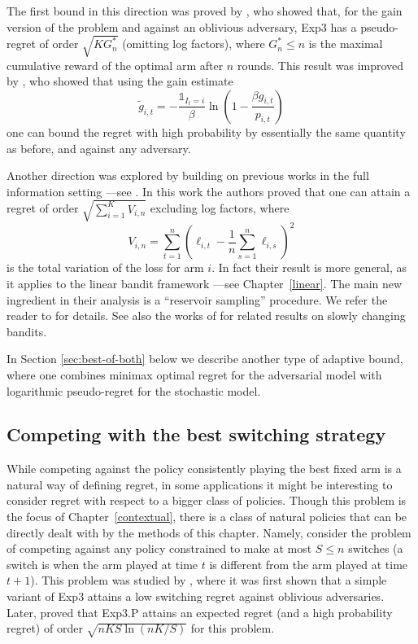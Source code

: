 \documentclass[11pt]{hackednow}
\def\ds1{\mathds{1}}
\renewcommand{\tilde}{\widetilde}
\begin{document}
The first bound in this direction was proved by \cite{ACFS03}, who showed that, for the gain version of the problem and against an oblivious adversary, Exp3 has a pseudo-regret of order $\sqrt{K G_n^*}$ (omitting log factors), where $G_n^* \leq n$ is the maximal cumulative reward of the optimal arm after $n$ rounds. This result was improved by \cite{AB10}, who showed that using the gain estimate
\[
    \tilde{g}_{i,t} = - \frac{\ds1_{I_t = i}}{\beta} \ln \left(1 - \frac{\beta g_{i,t}}{p_{i,t}} \right)
\]
one can bound the regret with high probability by essentially the same quantity as before, and against any adversary.

Another direction was explored by \cite{HK09} building on previous works in the full information setting ---see \cite{CMS07}. In this work the authors proved that one can attain a regret of order $\sqrt{\sum_{i=1}^K V_{i,n}}$ excluding log factors, where
\[
    V_{i,n} = \sum_{t=1}^n \left(\ell_{i,t} - \frac{1}{n} \sum_{s=1}^n \ell_{i,s} \right)^2
\]
is the total variation of the loss for arm $i$. In fact their result is more general, as it applies to the linear bandit framework ---see Chapter~\ref{linear}. The main new ingredient in their analysis is a ``reservoir sampling'' procedure. We refer the reader to \cite{HK09} for details. See also the works of \cite{slivkins2008adapting,slivkins2009contextual} for related results on slowly changing bandits.

In Section \ref{sec:best-of-both} below we describe another type of adaptive bound, where one combines minimax optimal regret for the adversarial model with logarithmic pseudo-regret for the stochastic model.


\subsection{Competing with the best switching strategy} \label{sec:exp3S}
While competing against the policy consistently playing the best fixed arm is a natural way of defining regret, in some applications it might be interesting to consider regret with respect to a bigger class of policies. Though this problem is the focus of Chapter~\ref{contextual}, there is a class of natural policies that can be directly dealt with by the methods of this chapter. Namely, consider the problem of competing against any policy constrained to make at most $S \leq n$ switches (a switch is when the arm played at time $t$ is different from the arm played at time $t+1$). This problem was studied by \cite{Aue02}, where it was first shown that a simple variant of Exp3 attains a low switching regret against oblivious adversaries. Later, \cite{AB10} proved that Exp3.P attains an expected regret (and a high probability regret) of order $\sqrt{n K S \ln (n K /S)}$ for this problem.
\end{document}
